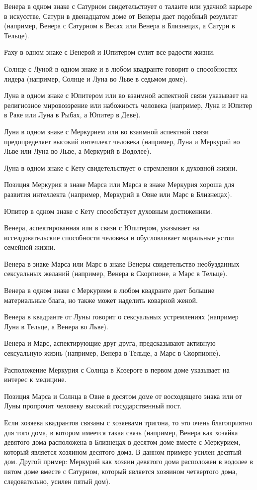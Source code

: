 Венера в одном знаке с Сатурном свидетельствует о таланте или удачной карьере в искусстве, Сатурн в двенадцатом доме от Венеры дает подобный результат (например, Венера с Сатурном в Весах или Венера в Близнецах, а Сатурн в Тельце).

Раху в одном знаке с Венерой и Юпитером сулит все радости жизни.

Солнце с Луной в одном знаке и в любом квадранте говорит о способностях лидера (например, Солнце и Луна во Льве в седьмом доме).

Луна в одном знаке с Юпитером или во взаимной аспектной связи указывает на религиозное мировоззрение или набожность человека (например, Луна и Юпитер в Раке или Луна в Рыбах, а Юпитер в Деве).

Луна в одном знаке с Меркурием или во взаимной аспектной связи предопределяет высокий интеллект человека (например, Луна и Меркурий во Льве или Луна во Льве, а Меркурий в Водолее).

Луна в одном знаке с Кету свидетельствует о стремлении к духовной жизни.

Позиция Меркурия в знаке Марса или Марса в знаке Меркурия хороша для развития интеллекта (например, Меркурий в Овне или Марс в Близнецах).

Юпитер в одном знаке с Кету способствует духовным достижениям.

Венера, аспектированная или в связи с Юпитером, указывает на исселдовательские способности человека и обусловливает моральные устои семейной жизни.

Венера в знаке Марса или Марс в знаке Венеры свидетельство необузданных сексуальных желаний (например, Венера в Скорпионе, а Марс в Тельце).

Венера в одном знаке с Меркурием в любом квадранте дает большие материальные блага, но также может наделить коварной женой.

Венера в квадранте от Луны говорит о сексуальных устремлениях (например Луна в Тельце, а Венера во Льве).

Венера и Марс, аспектирующие друг друга, предсказывают активную сексуальную жизнь (например, Венера в Тельце, а Марс в Скорпионе).

Расположение Меркурия с Солнца в Козероге в первом доме указывает на интерес к медицине.

Позиция Марса и Солнца в Овне в десятом доме от восходящего знака или от Луны пропрочит человеку высокий государственный пост.

Если хозяева квадрантов связаны с хозяевами тригона, то это очень благоприятно для того дома, в котором имеется такая связь (например, Венера как хозяйка девятого дома расположена в Близнецах в десятом доме вместе с Меркурием, который является хозяином десятого дома. В данном примере усилен десятый дом. Другой пример: Меркурий как хозяин девятого дома расположен в водолее в пятом доме вместе с Сатурном, который является хозяином четвертого дома, следовательно, усилен пятый дом).

